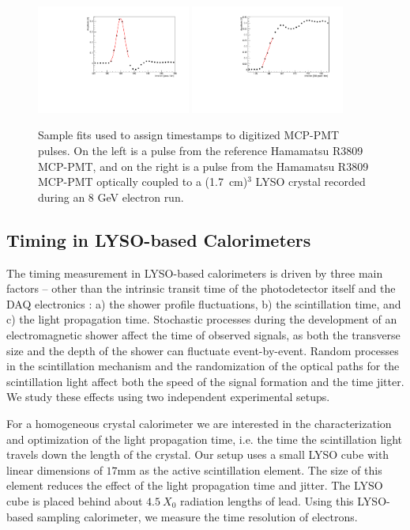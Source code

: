 \begin{figure}[h] \centering
\includegraphics[width=0.45\textwidth]{figs/Reference_Pulse_GausFit_057_ev322.pdf} 
\includegraphics[width=0.45\textwidth]{figs/LYSOCube_Pulse_RisingEdgeFit_057_ev313.pdf} 
\caption{\small Sample fits used to assign timestamps to digitized MCP-PMT pulses. 
On the left is a pulse from the reference Hamamatsu R3809 MCP-PMT, and
on the right is a pulse from the Hamamatsu R3809 MCP-PMT
optically coupled to a (1.7~cm)$^{3}$  LYSO crystal
recorded during an 8 GeV electron run.}
\label{fig:PulseFits}
\end{figure}


\subsection{Timing in LYSO-based Calorimeters}
The timing measurement in 
LYSO-based calorimeters is driven by three main factors  -- other  than the intrinsic transit 
time of the photodetector itself and the DAQ electronics : a) the shower profile fluctuations,  
b) the scintillation time, and c) the light propagation time. Stochastic processes during the
development of an electromagnetic shower affect the time of observed signals, as
both the transverse size and the depth of the shower can fluctuate event-by-event. 
Random processes in the scintillation mechanism and the randomization of
the optical paths for the scintillation light affect both the speed of the
signal formation and the time jitter. We study these effects using two
independent experimental setups. 

For a  homogeneous crystal calorimeter we are interested in the characterization and 
optimization of the light propagation time, i.e. the time the scintillation light travels
down the length of the crystal. Our setup uses a small LYSO cube with linear dimensions 
of $17\mathrm{mm}$ as the active scintillation element. The size of this element reduces 
the effect of the light propagation time and jitter. The LYSO cube is placed behind about 
$4.5~X_0$ radiation lengths of lead. Using this LYSO-based sampling calorimeter, we
measure the time resolution of electrons.

